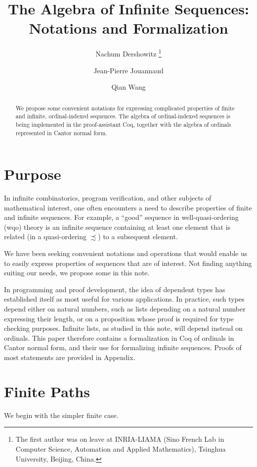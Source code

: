 \documentclass{llncs}
\title{The Algebra of Infinite Sequences:\\ Notations and Formalization}
\author{Nachum Dershowitz\inst{1}%
\thanks{The first author was on leave at INRIA-LIAMA
             (Sino French Lab in Computer Science, Automation
             and Applied Mathematics), Tsinghua University, Beijing, China.}
\and Jean-Pierre Jouannaud\inst{2,3}
\and Qian Wang\inst{2}}
\institute{School of Computer Science, Tel Aviv University, Ramat Aviv, Israel 
\and
School of Software, Tsinghua University, Beijing, China
\and
LIX, \'Ecole Polytechnique, Palaiseau, France}
\begin{document}
\maketitle

\begin{abstract}
We propose some convenient notations for expressing complicated
properties of finite and infinite, ordinal-indexed sequences. The
algebra of ordinal-indexed sequences is being implemented in the
proof-assistant Coq, together with the algebra of ordinals represented
in Cantor normal form.
\end{abstract}

\section{Purpose}

In infinite combinatorics, program verification, and other subjects of
mathematical interest, one often encounters a need to describe
properties of finite and infinite sequences.  For example, a ``good''
sequence in well-quasi-ordering (wqo) theory is an infinite sequence
containing at least one element that is related (in a quasi-ordering
$\precsim$) to a subsequent element.

We have been seeking convenient notations and operations that would
enable us to easily express properties of sequences that are of
interest.  Not finding anything suiting our needs, we propose some in
this note. 

In programming and proof development, the idea of dependent types
has established itself as most useful for various applications. In
practice, such types depend either on natural numbers, such as lists
depending on a natural number expressing their length, or on a
proposition whose proof is required for type checking
purposes. Infinite lists, as studied in this note, will depend instead
on ordinals. This paper therefore contains a formalization in Coq of
ordinals in Cantor normal form, and their use for formalizing infinite
sequences. Proofs of most statements are provided in Appendix.

\section{Finite Paths}

We begin with the simpler finite case.

\end{document}
